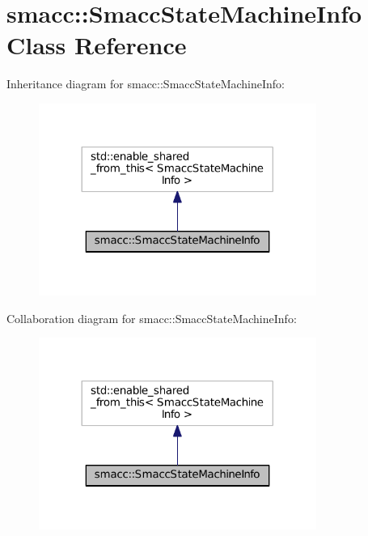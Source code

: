 \hypertarget{classsmacc_1_1SmaccStateMachineInfo}{}\section{smacc\+:\+:Smacc\+State\+Machine\+Info Class Reference}
\label{classsmacc_1_1SmaccStateMachineInfo}


Inheritance diagram for smacc\+:\+:Smacc\+State\+Machine\+Info\+:
\nopagebreak
\begin{figure}[H]
\begin{center}
\leavevmode
\includegraphics[width=257pt]{classsmacc_1_1SmaccStateMachineInfo__inherit__graph}
\end{center}
\end{figure}


Collaboration diagram for smacc\+:\+:Smacc\+State\+Machine\+Info\+:
\nopagebreak
\begin{figure}[H]
\begin{center}
\leavevmode
\includegraphics[width=257pt]{classsmacc_1_1SmaccStateMachineInfo__coll__graph}
\end{center}
\end{figure}
